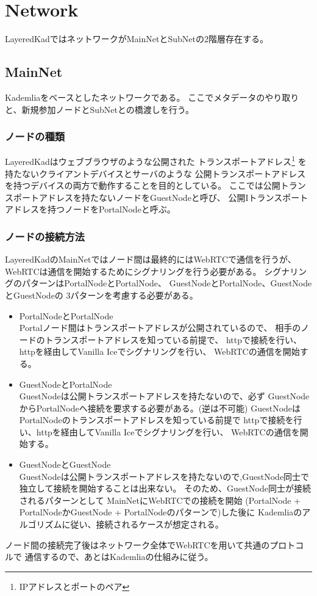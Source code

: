 \documentclass[sotsuron]{jcsie}
\begin{document}
\section{Network}
LayeredKadではネットワークがMainNetとSubNetの2階層存在する。

\subsection{MainNet}
Kademliaをベースとしたネットワークである。
ここでメタデータのやり取りと、新規参加ノードとSubNetとの橋渡しを行う。

\subsubsection{ノードの種類}
LayeredKadはウェブブラウザのような公開された
トランスポートアドレス\footnote{IPアドレスとポートのペア}
を持たないクライアントデバイスとサーバのような
公開トランスポートアドレスを持つデバイスの両方で動作することを目的としている。
ここでは公開トランスポートアドレスを持たないノードをGuestNodeと呼び、
公開Iトランスポートアドレスを持つノードをPortalNodeと呼ぶ。

\subsubsection{ノードの接続方法}
LayeredKadのMainNetではノード間は最終的にはWebRTCで通信を行うが、
WebRTCは通信を開始するためにシグナリングを行う必要がある。
シグナリングのパターンはPortalNodeとPortalNode、
GuestNodeとPortalNode、GuestNodeとGuestNodeの
3パターンを考慮する必要がある。

\begin{itemize}
	\item {PortalNodeとPortalNode}\\
	Portalノード間はトランスポートアドレスが公開されているので、
	相手のノードのトランスポートアドレスを知っている前提で、
	http\cite{fielding1999hypertext}で接続を行い、
	httpを経由してVanilla Iceでシグナリングを行い、
	WebRTCの通信を開始する。
	\\
	\item {GuestNodeとPortalNode}\\
	GuestNodeは公開トランスポートアドレスを持たないので、必ず
	GuestNodeからPortalNodeへ接続を要求する必要がある。(逆は不可能)
	GuestNodeはPortalNodeのトランスポートアドレスを知っている前提で
	httpで接続を行い、httpを経由してVanilla Iceでシグナリングを行い、
	WebRTCの通信を開始する。
	\\
	\item {GuestNodeとGuestNode}\\
	GuestNodeは公開トランスポートアドレスを持たないので,GuestNode同士で
	独立して接続を開始することは出来ない。
	そのため、GuestNode同士が接続されるパターンとして
	MainNetにWebRTCでの接続を開始
	(PortalNode + PortalNodeかGuestNode + PortalNodeのパターンで)した後に
	Kademliaのアルゴリズムに従い、接続されるケースが想定される。
\end{itemize}
ノード間の接続完了後はネットワーク全体でWebRTCを用いて共通のプロトコルで
通信するので、あとはKademliaの仕組みに従う。
\end{document}

